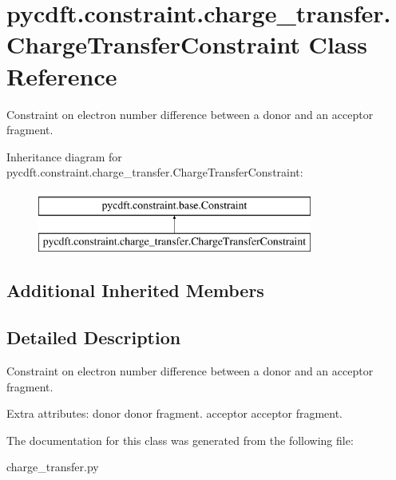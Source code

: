\hypertarget{classpycdft_1_1constraint_1_1charge__transfer_1_1ChargeTransferConstraint}{\section{pycdft.\-constraint.\-charge\-\_\-transfer.\-Charge\-Transfer\-Constraint Class Reference}
\label{classpycdft_1_1constraint_1_1charge__transfer_1_1ChargeTransferConstraint}
}


Constraint on electron number difference between a donor and an acceptor fragment.  


Inheritance diagram for pycdft.\-constraint.\-charge\-\_\-transfer.\-Charge\-Transfer\-Constraint\-:\begin{figure}[H]
\begin{center}
\leavevmode
\includegraphics[height=2.000000cm]{classpycdft_1_1constraint_1_1charge__transfer_1_1ChargeTransferConstraint}
\end{center}
\end{figure}
\subsection*{Additional Inherited Members}


\subsection{Detailed Description}
Constraint on electron number difference between a donor and an acceptor fragment. 

Extra attributes\-: donor donor fragment. acceptor acceptor fragment. 

The documentation for this class was generated from the following file\-:\begin{DoxyCompactItemize}
\item 
charge\-\_\-transfer.\-py\end{DoxyCompactItemize}

